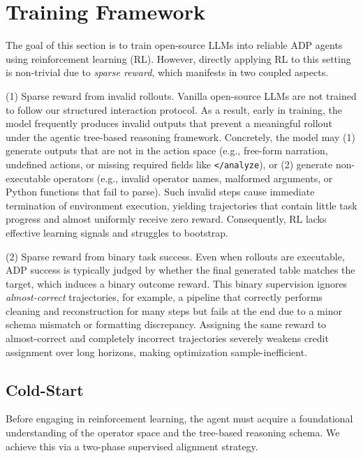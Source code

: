 \section{Training Framework}
\label{sec:agentic_training_framework}

The goal of this section is to train open-source LLMs into reliable ADP agents using reinforcement learning (RL).
However, directly applying RL to this setting is non-trivial due to \textit{sparse reward}, which manifests in two coupled aspects.

(1) {Sparse reward from invalid rollouts.}
Vanilla open-source LLMs are not trained to follow our structured interaction protocol. 
As a result, early in training, the model frequently produces invalid outputs that prevent a meaningful rollout under the agentic tree-based reasoning framework.
Concretely, the model may (1) generate outputs that are not in the action space (e.g., free-form narration, undefined actions, or missing required fields like \texttt{</analyze}), or (2) generate non-executable operators (e.g., invalid operator names, malformed arguments, or Python functions that fail to parse).
Such invalid steps cause immediate termination of environment execution, yielding trajectories that contain little task progress and almost uniformly receive zero reward.
Consequently, RL lacks effective learning signals and struggles to bootstrap.

(2) {Sparse reward from binary task success.}
Even when rollouts are executable, ADP success is typically judged by whether the final generated table matches the target, which induces a binary outcome reward.
This binary supervision ignores \textit{almost-correct} trajectories, for example, a pipeline that correctly performs cleaning and reconstruction for many steps but fails at the end due to a minor schema mismatch or formatting discrepancy.
Assigning the same reward to almost-correct and completely incorrect trajectories severely weakens credit assignment over long horizons, making optimization sample-inefficient.





\subsection{Cold-Start}
\label{subsec:cold_start}

Before engaging in reinforcement learning, the agent must acquire a foundational understanding of the operator space and the tree-based reasoning schema. We achieve this via a two-phase supervised alignment strategy.

